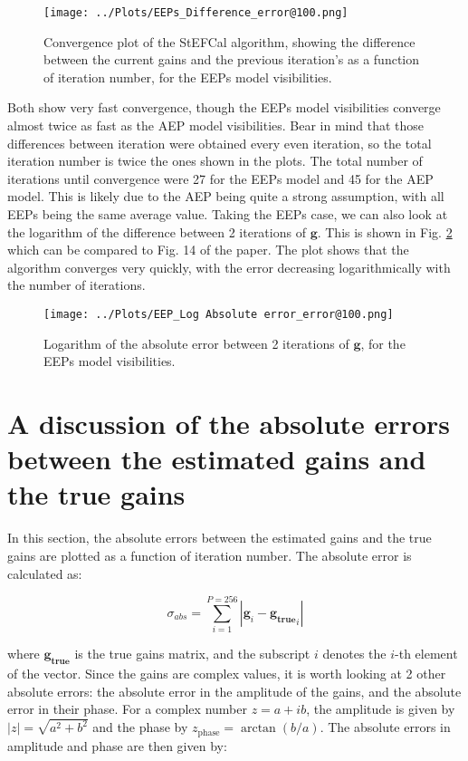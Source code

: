 \documentclass[12pt]{report} %
\begin{document}
\begin{figure}[h]
  \centering
  \texttt{[image: ../Plots/EEPs\_Difference\_error@100.png]}
  \caption{Convergence plot of the StEFCal algorithm, showing the difference between the current gains and the previous iteration's as a function of iteration number, for the EEPs model visibilities.}
  \label{fig:convergence_EEP}
\end{figure}

\newpage
Both show very fast convergence, though the EEPs model visibilities converge almost twice as fast as the AEP model visibilities. Bear in mind that those differences between iteration were obtained every even iteration, so the total iteration number is twice the ones shown in the plots. The total number of iterations until convergence were 27 for the EEPs model and 45 for the AEP model. This is likely due to the AEP being quite a strong assumption, with all EEPs being the same average value. Taking the EEPs case, we can also look at the logarithm of the difference between 2 iterations of $\mathbf{g}$. This is shown in Fig. \ref{fig:log_convergence_EEP} which can be compared to Fig. 14 of the paper\cite{salvini2014fast}. The plot shows that the algorithm converges very quickly, with the error decreasing logarithmically with the number of iterations.


\begin{figure}[h]
  \centering
  \texttt{[image: ../Plots/EEP\_Log Absolute error\_error@100.png]}
  \caption{Logarithm of the absolute error between 2 iterations of $\mathbf{g}$, for the EEPs model visibilities.}
  \label{fig:log_convergence_EEP}
\end{figure}

\newpage
\section{A discussion of the absolute errors between the estimated gains and the true gains}

In this section, the absolute errors between the estimated gains and the true gains are plotted as a function of iteration number. The absolute error is calculated as:

\begin{equation}
    \sigma_{abs} = \sum_{i = 1}^{P = 256}|\mathbf{g}_{i} - \mathbf{g_{\text{true}}}_{i}|
\end{equation}

where $\mathbf{g_{\text{true}}}$ is the true gains matrix, and the subscript $i$ denotes the $i$-th element of the vector. Since the gains are complex values, it is worth looking at 2 other absolute errors: the absolute error in the amplitude of the gains, and the absolute error in their phase. For a complex number $z = a + ib$, the amplitude is given by $|z| = \sqrt{a^{2} + b^{2}}$ and the phase by $z_{\text{phase}} = \arctan(b/a)$. The absolute errors in amplitude and phase are then given by:
\end{document}
